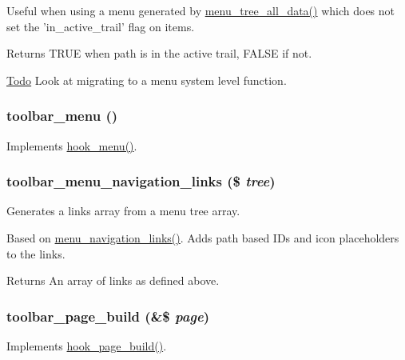 Useful when using a menu generated by \hyperlink{group__menu_ga4f06528e6ed613b6a885e051035b322a}{menu\_\-tree\_\-all\_\-data()} which does not set the 'in\_\-active\_\-trail' flag on items.

\begin{DoxyReturn}{Returns}
TRUE when path is in the active trail, FALSE if not.
\end{DoxyReturn}
\begin{Desc}
\item[\hyperlink{todo__todo000022}{Todo}]Look at migrating to a menu system level function. \end{Desc}
\hypertarget{toolbar_8module_a3d6ba4473eecb99377495528080de652}{
\subsubsection[{toolbar\_\-menu}]{\setlength{\rightskip}{0pt plus 5cm}toolbar\_\-menu ()}}
\label{toolbar_8module_a3d6ba4473eecb99377495528080de652}
Implements \hyperlink{group__hooks_ga5c95244fea59b25666e409759e133ded}{hook\_\-menu()}. \hypertarget{toolbar_8module_a42f64eec2db73a6bcf05b1301509dd91}{
\subsubsection[{toolbar\_\-menu\_\-navigation\_\-links}]{\setlength{\rightskip}{0pt plus 5cm}toolbar\_\-menu\_\-navigation\_\-links (\$ {\em tree})}}
\label{toolbar_8module_a42f64eec2db73a6bcf05b1301509dd91}
Generates a links array from a menu tree array.

Based on \hyperlink{group__menu_gab4cdacc813ae9e06271aa4aa2d9495a7}{menu\_\-navigation\_\-links()}. Adds path based IDs and icon placeholders to the links.

\begin{DoxyReturn}{Returns}
An array of links as defined above. 
\end{DoxyReturn}
\hypertarget{toolbar_8module_ad5fcbe045bc4142d508108741ffe7b18}{
\subsubsection[{toolbar\_\-page\_\-build}]{\setlength{\rightskip}{0pt plus 5cm}toolbar\_\-page\_\-build (\&\$ {\em page})}}
\label{toolbar_8module_ad5fcbe045bc4142d508108741ffe7b18}
Implements \hyperlink{group__hooks_ga16d8d8ae818dc759bbe539e16ff5b93b}{hook\_\-page\_\-build()}.

